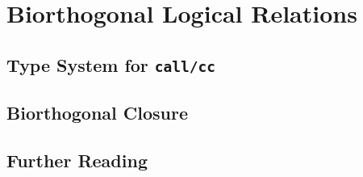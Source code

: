 \chapter{Biorthogonal Logical Relations}


\section{Type System for \texttt{call/cc}}

\section{Biorthogonal Closure}

\section{Further Reading}
